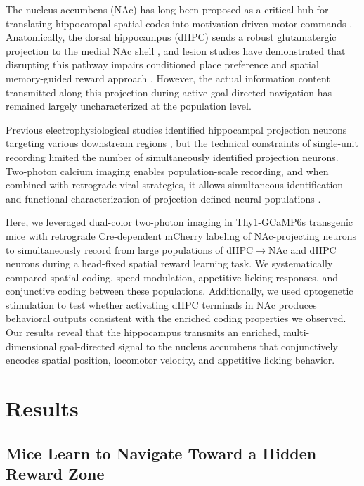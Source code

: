 \documentclass[11pt]{article}
\begin{document}
The nucleus accumbens (NAc) has long been proposed as a critical hub for translating hippocampal spatial codes into motivation-driven motor commands \citep{mogenson1980limbic, pennartz2011hippocampalnac}. Anatomically, the dorsal hippocampus (dHPC) sends a robust glutamatergic projection to the medial NAc shell \citep{britt2012synaptic}, and lesion studies have demonstrated that disrupting this pathway impairs conditioned place preference and spatial memory-guided reward approach \citep{lecourtier2007role, trouche2019hippocampal}. However, the actual information content transmitted along this projection during active goal-directed navigation has remained largely uncharacterized at the population level.

Previous electrophysiological studies identified hippocampal projection neurons targeting various downstream regions \citep{ciocchi2015selective}, but the technical constraints of single-unit recording limited the number of simultaneously identified projection neurons. Two-photon calcium imaging enables population-scale recording, and when combined with retrograde viral strategies, it allows simultaneous identification and functional characterization of projection-defined neural populations \citep{dombeck2010functional, danielson2016distinct}.

Here, we leveraged dual-color two-photon imaging in Thy1-GCaMP6s transgenic mice \citep{dana2014thy1} with retrograde Cre-dependent mCherry labeling of NAc-projecting neurons to simultaneously record from large populations of dHPC$\to$NAc and dHPC$^{-}$ neurons during a head-fixed spatial reward learning task. We systematically compared spatial coding, speed modulation, appetitive licking responses, and conjunctive coding between these populations. Additionally, we used optogenetic stimulation \citep{boyden2005millisecond} to test whether activating dHPC terminals in NAc produces behavioral outputs consistent with the enriched coding properties we observed. Our results reveal that the hippocampus transmits an enriched, multi-dimensional goal-directed signal to the nucleus accumbens that conjunctively encodes spatial position, locomotor velocity, and appetitive licking behavior.

\section{Results}

\subsection{Mice Learn to Navigate Toward a Hidden Reward Zone}
\end{document}
